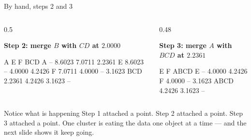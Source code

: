 \documentclass[aspectratio=169]{beamer}
\begin{document}
\begin{frame}[fragile,shrink=4]{By hand, steps 2 and 3}
  \begin{columns}[T]
    \begin{column}{0.5\textwidth}
      \begin{center}\small\textbf{Step 2: merge $B$ with $CD$ at $2.0000$}\end{center}
\begin{outblk}
                   A         E         F       BCD
A                 --    8.6023    7.0711    2.2361
E             8.6023        --    4.0000    4.2426
F             7.0711    4.0000        --    3.1623
BCD           2.2361    4.2426    3.1623        --
\end{outblk}
    \end{column}
    \begin{column}{0.48\textwidth}
      \begin{center}\small\textbf{Step 3: merge $A$ with $BCD$ at $2.2361$}\end{center}
\begin{outblk}
                   E         F      ABCD
E                 --    4.0000    4.2426
F             4.0000        --    3.1623
ABCD          4.2426    3.1623        --
\end{outblk}
    \end{column}
  \end{columns}
  \vspace{0.4em}
  \begin{alertblock}{Notice what is happening}
    Step 1 attached a point. Step 2 attached a point. Step 3 attached a point.
    One cluster is eating the data one object at a time --- and the next slide
    shows it keep going.
  \end{alertblock}
\end{frame}
\end{document}
